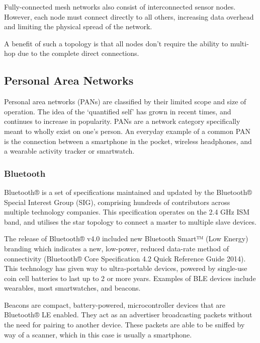 Fully-connected mesh networks also consist of interconnected sensor nodes. However, each node must connect directly to all others, increasing data overhead and limiting the physical spread of the network.

A benefit of such a topology is that all nodes don’t require the ability to multi-hop due to the complete direct connections.


\subsection{Personal Area Networks}

Personal area networks (PANs) are classified by their limited scope and size of operation. The idea of the ‘quantified self’ has grown in recent times, and continues to increase in popularity. PANs are a network category specifically meant to wholly exist on one’s person. An everyday example of a common PAN is the connection between a smartphone in the pocket, wireless headphones, and a wearable activity tracker or smartwatch.

\subsubsection{Bluetooth}

Bluetooth® is a set of specifications maintained and updated by the Bluetooth® Special Interest Group (SIG), comprising hundreds of contributors across multiple technology companies. This specification operates on the 2.4 GHz ISM band, and utilises the star topology to connect a master to multiple slave devices.

The release of Bluetooth® v4.0 included new Bluetooth Smart™ (Low Energy) branding which indicates a new, low-power, reduced data-rate method of connectivity (Bluetooth® Core Specification 4.2 Quick Reference Guide 2014). This technology has given way to ultra-portable devices, powered by single-use coin cell batteries to last up to 2 or more years. Examples of BLE devices include wearables, most smartwatches, and beacons.

Beacons are compact, battery-powered, microcontroller devices that are Bluetooth® LE enabled. They act as an advertiser broadcasting packets without the need for pairing to another device. These packets are able to be sniffed by way of a scanner, which in this case is usually a smartphone.

